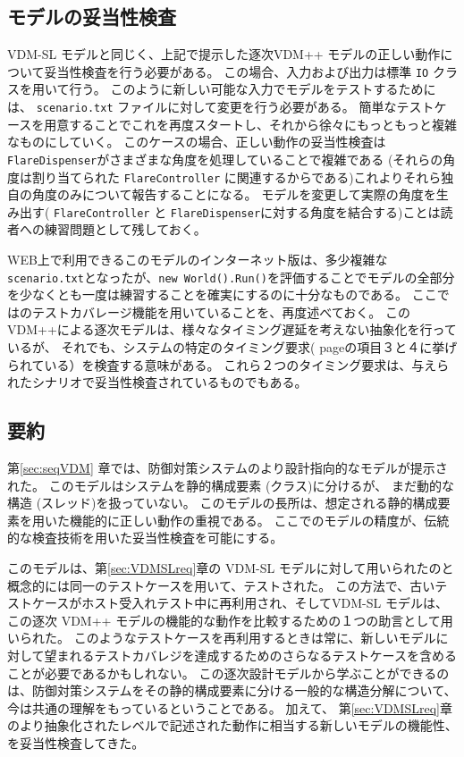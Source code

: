 \documentclass[\pformat,12pt]{jreport}
\begin{document}
\subsection{モデルの妥当性検査}

VDM-SL モデルと同じく、上記で提示した逐次VDM++ モデルの正しい動作について妥当性検査を行う必要がある。
この場合、入力および出力は標準 \texttt{IO} クラスを用いて行う。
このように新しい可能な入力でモデルをテストするためには、 \texttt{scenario.txt} ファイルに対して変更を行う必要がある。
簡単なテストケースを用意することでこれを再度スタートし、それから徐々にもっともっと複雑なものにしていく。
このケースの場合、正しい動作の妥当性検査は\texttt{FlareDispenser}がさまざまな角度を処理していることで複雑である (それらの角度は割り当てられた \texttt{FlareController} に関連するからである)これよりそれら独自の角度のみについて報告することになる。
モデルを変更して実際の角度を生み出す( \texttt{FlareController} と \texttt{FlareDispenser}に対する角度を結合する)ことは読者への練習問題として残しておく。

WEB上で利用できるこのモデルのインターネット版は、多少複雑な\texttt{scenario.txt}となったが、\texttt{new World().Run()}を評価することでモデルの全部分を少なくとも一度は練習することを確実にするのに十分なものである。
ここでは\VDMTools のテストカバレージ機能を用いていることを、再度述べておく。
このVDM++による逐次モデルは、様々なタイミング遅延を考えない抽象化を行っているが、
それでも、システムの特定のタイミング要求( page\pageref{timereq34}の項目３と４に挙げられている）を検査する意味がある。
これら２つのタイミング要求は、与えられたシナリオで妥当性検査されているものでもある。

\subsection{要約}

第\ref{sec:seqVDM} 章では、防御対策システムのより設計指向的なモデルが提示された。
このモデルはシステムを静的構成要素 (クラス)に分けるが、 まだ動的な構造 (スレッド)を扱っていない。
このモデルの長所は、想定される静的構成要素を用いた機能的に正しい動作の重視である。
ここでのモデルの精度が、伝統的な検査技術を用いた妥当性検査を可能にする。

このモデルは、第\ref{sec:VDMSLreq}章の VDM-SL モデルに対して用いられたのと概念的には同一のテストケースを用いて、テストされた。
この方法で、古いテストケースがホスト受入れテスト中に再利用され、そしてVDM-SL モデルは、この逐次 VDM++ モデルの機能的な動作を比較するための１つの助言として用いられた。
このようなテストケースを再利用するときは常に、新しいモデルに対して望まれるテストカバレジを達成するためのさらなるテストケースを含めることが必要であるかもしれない。
この逐次設計モデルから学ぶことができるのは、防御対策システムをその静的構成要素に分ける一般的な構造分解について、今は共通の理解をもっているということである。
加えて、 第\ref{sec:VDMSLreq}章のより抽象化されたレベルで記述された動作に相当する新しいモデルの機能性、を妥当性検査してきた。
\end{document}
